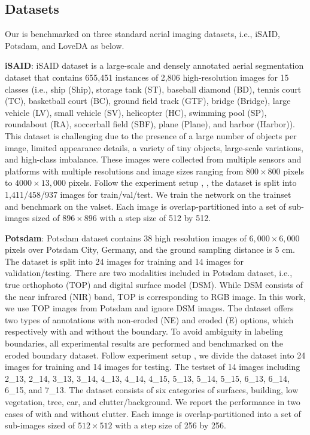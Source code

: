 \documentclass[journal]{IEEEtran}
\begin{document}
\subsection{Datasets}
Our \model is benchmarked on three standard aerial imaging datasets, i.e., iSAID, Potsdam, and LoveDA as below.  

\noindent\textbf{iSAID}: iSAID dataset \cite{Waqas2019} is a large-scale and densely annotated aerial segmentation dataset that contains 655,451 instances of 2,806 high-resolution images for 15 classes (i.e., ship (Ship), storage tank (ST), baseball diamond (BD), tennis court (TC), basketball court (BC), ground field track (GTF), bridge (Bridge), large vehicle (LV), small vehicle (SV), helicopter (HC), swimming pool (SP), roundabout (RA), soccerball field (SBF), plane (Plane), and harbor (Harbor)). This dataset is challenging due to the presence of a large number of objects per image, limited appearance details, a variety of tiny objects, large-scale variations, and high-class imbalance. These images were collected from multiple sensors and platforms with multiple resolutions and image sizes ranging from $800 \times 800$ pixels to  $4000 \times 13,000$ pixels. Follow the experiment setup \cite{zheng2020foreground}, \cite{li2021pointflow}, the dataset is split into 1,411/458/937 images for train/val/test. We train the network on the trainset and benchmark on the valset. Each image is overlap-partitioned into a set of sub-images sized of $896 \times 896$ with a step size of 512 by 512. 







\noindent\textbf{Potsdam}: Potsdam dataset \cite{potsdam} contains $38$ high resolution images of $6,000 \times 6,000$ pixels over Potsdam City, Germany, and the ground sampling distance is 5 cm. The dataset is split into 24 images for training and 14 images for validation/testing. There are two modalities included in Potsdam dataset, i.e., true orthophoto (TOP) and digital surface model (DSM). While DSM consists of the near infrared (NIR) band, TOP is corresponding to RGB image. In this work, we use TOP images from Potsdam and ignore DSM images. 
The dataset offers two types of annotations with non-eroded (NE) and eroded (E) options, which respectively with and without the boundary. To avoid ambiguity in labeling boundaries, all experimental results are performed and benchmarked on the eroded boundary dataset. 
Follow experiment setup \cite{he2022swin}, \cite{wang2022empirical} we divide the dataset into 24 images for training and 14 images for testing. The testset of 14 images including 2\_13, 2\_14, 3\_13, 3\_14, 4\_13, 4\_14, 4\_15, 5\_13, 5\_14, 5\_15, 6\_13, 6\_14, 6\_15, and 7\_13. The dataset consists of six categories of surfaces, building, low vegetation, tree, car, and clutter/background. We report the performance in two cases of with and without clutter. Each image is overlap-partitioned into a set of sub-images sized of $512 \times 512$ with a step size of 256 by 256. 
\end{document}
